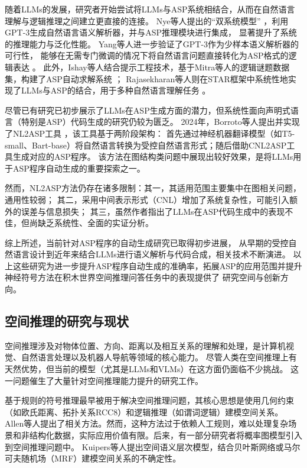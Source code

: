 随着LLMs的发展，研究者开始尝试将LLMs与ASP系统相结合，从而在自然语言理解与逻辑推理之间建立更直接的连接。
Nye等人提出的“双系统模型” \cite{nye2021improving}，利用GPT-3生成自然语言语义解析器，并与ASP推理模块进行集成，
显著提升了系统的推理能力与泛化性能。
Yang等人进一步验证了GPT-3作为少样本语义解析器的可行性，
能够在无需专门微调的情况下将自然语言问题直接转化为ASP格式的逻辑表达 \cite{yang2023coupling}。
此外，Ishay等人结合提示工程技术，基于Mitra等人的逻辑谜题数据集，构建了ASP自动求解系统 \cite{mitra2016addressing}；
Rajasekharan等人则在STAR框架中系统性地实现了LLMs与ASP的结合，用于多种自然语言理解任务 \cite{rajasekharan2023reliable}。

尽管已有研究已初步展示了LLMs在ASP生成方面的潜力，但系统性面向声明式语言（特别是ASP）代码生成的研究仍较为匮乏。
2024年，Borroto等人提出并实现了NL2ASP工具 \cite{borroto2024automaticcompositionaspprograms}，该工具基于两阶段架构：
首先通过神经机器翻译模型（如T5-small、Bart-base）将自然语言转换为受控自然语言形式；随后借助CNL2ASP工具生成对应的ASP程序。
该方法在图结构类问题中展现出较好效果，是将LLMs用于ASP程序自动生成的重要探索之一。

然而，NL2ASP方法仍存在诸多限制：其一，其适用范围主要集中在图相关问题，通用性较弱；
其二，采用中间表示形式（CNL）增加了系统复杂性，可能引入额外的误差与信息损失；
其三，虽然作者指出了LLMs在ASP代码生成中的表现不佳，但尚缺乏系统性、全面的实证分析。

综上所述，当前针对ASP程序的自动生成研究已取得初步进展，
从早期的受控自然语言设计到近年来结合LLMs进行语义解析与代码合成，相关技术不断演进。
以上这些研究为进一步提升ASP程序自动生成的准确率，拓展ASP的应用范围并提升神经符号方法在积木世界空间推理问答任务中的表现提供了
研究空间与创新方向。
\subsection{空间推理的研究与现状}
空间推理涉及对物体位置、方向、距离以及相互关系的理解和处理，是计算机视觉、自然语言处理以及机器人导航等领域的核心能力。
尽管人类在空间推理上有天然优势，但当前的模型（尤其是LLMs和VLMs）在这方面仍面临不少挑战。
这一问题催生了大量针对空间推理能力提升的研究工作。

基于规则的符号推理最早被用于解决空间推理问题，其核心思想是使用几何约束（如欧氏距离、拓扑关系RCC8）和逻辑推理（如谓词逻辑）建模空间关系。
Allen等人提出了相关方法。然而，这种方法过于依赖人工规则，难以处理复杂场景和非结构化数据，实际应用价值有限。后来，有一部分研究者将概率图模型引入到空间推理问题中。
Kuipers等人提出空间语义层次模型，结合贝叶斯网络或马尔可夫随机场（MRF）建模空间关系的不确定性。

